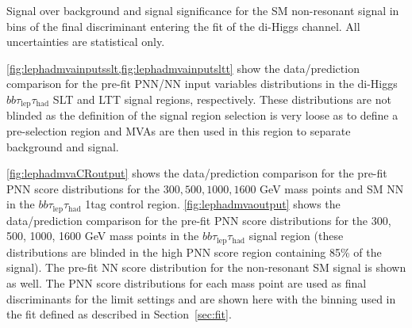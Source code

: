   
\begin{table}
  \centering
  {
    \footnotesize
    
  }
  \caption{Signal over background and signal significance for the SM
    non-resonant signal in bins of the final discriminant entering the
    fit of the di-Higgs \lephad channel. All uncertainties are
    statistical only. }
  \label{tab:significance_smbdt_bins_LepHad}
\end{table}


\cref{fig:lephadmvainputsslt,fig:lephadmvainputsltt} show the data/prediction comparison for the pre-fit PNN/NN input variables distributions in the di-Higgs $bb\tau_\mathrm{lep}\tau_\mathrm{had}$ SLT and LTT signal regions, respectively. These distributions are not blinded as the definition of the signal region selection is very loose as to define a pre-selection region and MVAs are then used in this region to separate background and signal.

\cref{fig:lephadmvaCRoutput} shows the data/prediction comparison for the pre-fit PNN score distributions for the $300, 500, 1000, 1600$ GeV mass points and SM NN in the $bb\tau_\mathrm{lep}\tau_\mathrm{had}$ 1tag control region.
\cref{fig:lephadmvaoutput} shows the data/prediction comparison for the pre-fit PNN score distributions for the 300, 500, 1000, 1600 GeV mass points in the $bb\tau_\mathrm{lep}\tau_\mathrm{had}$ signal region (these distributions are blinded in the high PNN score region containing 85\% of the signal). The pre-fit NN score distribution for the non-resonant SM signal is shown as well. The PNN score distributions for each mass point are used as final discriminants for the limit settings and are shown here with the binning used in the fit defined as described in Section~\ref{sec:fit}.


